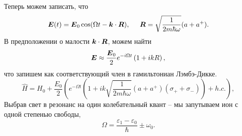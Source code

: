 Теперь можем записать, что
\begin{equation*}
    \mbox{\boldmath $E$}(t) = \mbox{\boldmath $E$}_0 \cos(\Omega t - \mbox{\boldmath $k$} \cdot \mbox{\boldmath $R$}),
    \hspace{5 mm} 
    \mbox{\boldmath $R$} = \sqrt{\frac{1}{2 m \hbar \omega}} (a + a^+).
\end{equation*}
В предположении о малости $\mbox{\boldmath $k$} \cdot \mbox{\boldmath $R$}$, можем найти
\begin{equation*}
    \mbox{\boldmath $E$} \approx \frac{\mbox{\boldmath $E$}_0}{2} 
        e^{-i \Omega t} \left(
            1 + i k R
        \right),
\end{equation*}
что запишем как соответствующий член в гамильтониан Лэмбэ-Дикке.
\begin{equation*}
    \hat{H} = H_0 + \frac{E_0}{2} \left(
        e^{-\Omega t} \left(
            1 + ik \sqrt{\frac{1}{2 m \hbar \omega}} (a + a^+)(\sigma_+ + \sigma_-)
        \right) + h.c.
    \right),
\end{equation*}
Выбрав свет в резонанс на один колебательный квант -- мы запутываем ион с одной степенью свободы,
\begin{equation*}
    \Omega = \frac{\varepsilon_1 - \varepsilon_0}{\hbar} \pm \omega_0.
\end{equation*}


















